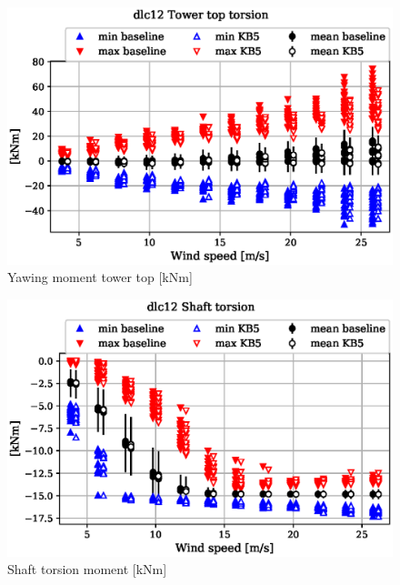 \begin{figure}[!ht]
\begin{center}
	\includegraphics[width=.85\linewidth]{figures/baseline-vs-KB6/dlc12/tower-tower-node-004-momentvec-z_AA0008_AA0008.eps}
\end{center}
\caption{Yawing moment tower top [kNm]}
\label{fig:baseline-vs-KB6:dlc12:tower-top-yaw}
\end{figure}

\begin{figure}[!ht]
\begin{center}
	\includegraphics[width=.85\linewidth]{figures/baseline-vs-KB6/dlc12/shaft-shaft-node-001-momentvec-z_AA0008_AA0008.eps}
\end{center}
\caption{Shaft torsion moment [kNm]}
\label{fig:baseline-vs-KB6:dlc12:shaft-torsion}
\end{figure}

